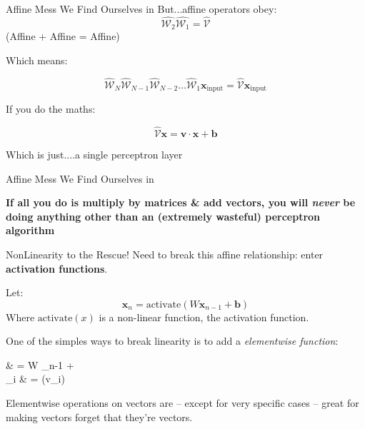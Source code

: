 \documentclass[]{SangerLibrary/sanger-present}
\renewcommand\vec[1]{\boldsymbol{\mathbf{#1}}}
\begin{document}
	\begin{frame}{Affine Mess We Find Ourselves in}
		But...affine operators obey:
		\begin{equation}
			\hat{\mathcal{W}_2} \hat{\mathcal{W}_1} = \hat{\mathcal{V}}
		\end{equation}
		(Affine + Affine = Affine)

		Which means:

		\begin{equation}
			\hat{\mathcal{W}}_N \hat{\mathcal{W}}_{N-1} \hat{\mathcal{W}}_{N-2} \hdots \hat{\mathcal{W}}_{1}  \vec{x}_\text{input}  = \hat{\mathcal{V}} \vec{x}_\text{input} 
		\end{equation}

		\pause If you do the maths:

		\begin{equation}
			\hat{\mathcal{V}} \vec{x}= \vec{v} \cdot \vec{x} + \vec{b} 
		\end{equation}

		\pause Which is just....a single perceptron layer
	\end{frame}

	\begin{frame}{Affine Mess We Find Ourselves in}

		\begin{center}
			\bf If all you do is multiply by matrices \& add vectors, you will \textit{never} be doing anything other than an (extremely wasteful) perceptron algorithm
		\end{center}
		
	\end{frame}

	\begin{frame}{NonLinearity to the Rescue!}
		Need to break this affine relationship: enter \textbf{activation functions}.

		Let:
		\begin{equation}
			\vec{x}_n = \text{activate}\left(W \vec{x}_{n-1} + \vec{b} \right)
		\end{equation}
		Where $\text{activate}\left(x\right)$ is a non-linear function, the activation function.

		One of the simples ways to break linearity is to add a \textit{elementwise function}:

		\begin{spalign}
			\vec{v} & = W \vec{x}_{n-1} + \vec{b}
			\\
			[\vec{x}_n]_i & = \sigma(v_i)
		\end{spalign}
		
		Elementwise operations on vectors are -- except for very specific cases -- great for making vectors forget that they're vectors.
	\end{frame}
\end{document}
